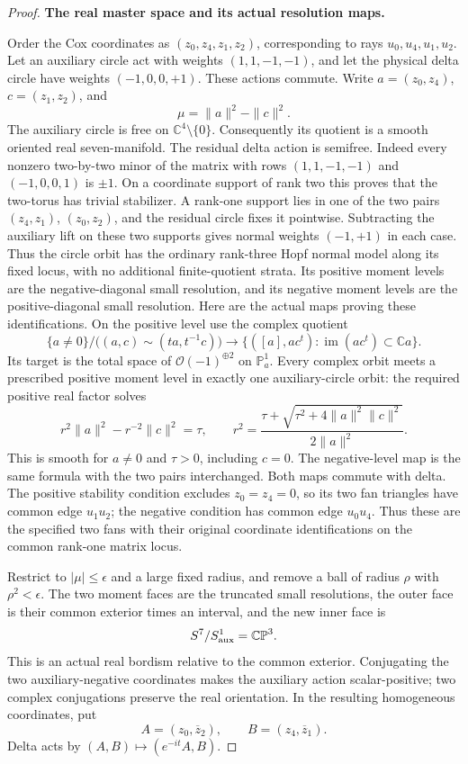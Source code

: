 \begin{proof}
\par\medskip\noindent\textbf{The real master space and its actual resolution maps.}\enspace

Order the Cox coordinates as \((z_0,z_4,z_1,z_2)\), corresponding
to rays \(u_0,u_4,u_1,u_2\).  Let an auxiliary circle act with
weights \((1,1,-1,-1)\), and let the physical delta circle have
weights \((-1,0,0,+1)\).  These actions commute.  Write
\(a=(z_0,z_4)\), \(c=(z_1,z_2)\), and
\[
       \mu=\|a\|^2-\|c\|^2.
\]
The auxiliary circle is free on \(\mathbb C^4\setminus\{0\}\).
Consequently its quotient is a smooth oriented real seven-manifold.
The residual delta action is semifree.  Indeed every nonzero
two-by-two minor of the matrix with rows
\((1,1,-1,-1)\) and \((-1,0,0,1)\) is \(\pm1\).
On a coordinate support of rank two this proves that the
two-torus has trivial stabilizer.  A rank-one support lies in
one of the two pairs \((z_4,z_1)\), \((z_0,z_2)\),
and the residual circle fixes it pointwise.  Subtracting the
auxiliary lift on these two supports gives normal weights
\((-1,+1)\) in each case.  Thus the circle orbit has the
ordinary rank-three Hopf normal model along its fixed locus,
with no additional finite-quotient strata.
Its positive moment levels are the negative-diagonal small resolution,
and its negative moment levels are the positive-diagonal small
resolution.  Here are the actual maps proving these identifications.
On the positive level use the complex quotient
\[
   \{a\ne0\}\big/\bigl((a,c)\sim(ta,t^{-1}c)\bigr)
       \longrightarrow
   \{([a],ac^t):\operatorname{im}(ac^t)\subset\mathbb Ca\}.
\]
Its target is the total space of \(\mathcal O(-1)^{\oplus2}\)
on \(\mathbb P^1_a\).  Every complex orbit meets a prescribed
positive moment level in exactly one auxiliary-circle orbit:
the required positive real factor solves
\[
 r^2\|a\|^2-r^{-2}\|c\|^2=\tau,
 \qquad
 r^2=\frac{\tau+\sqrt{\tau^2+4\|a\|^2\|c\|^2}}
                 {2\|a\|^2}.
\]
This is smooth for \(a\ne0\) and \(\tau>0\), including
\(c=0\).  The negative-level map is the same formula with
the two pairs interchanged.  Both maps commute with delta.
The positive stability condition excludes \(z_0=z_4=0\),
so its two fan triangles have common edge \(u_1u_2\);
the negative condition has common edge \(u_0u_4\).
Thus these are the specified two fans with their original
coordinate identifications on the common rank-one matrix locus.

Restrict to \(|\mu|\le\epsilon\) and a large fixed radius,
and remove a ball of radius \(\rho\) with \(\rho^2<\epsilon\).
The two moment faces are the truncated small resolutions, the
outer face is their common exterior times an interval, and the
new inner face is
\[
             S^7/S^1_{\rm aux}=\mathbb {CP}^3.
\]
This is an actual real bordism relative to the common exterior.
Conjugating the two auxiliary-negative coordinates makes the
auxiliary action scalar-positive; two complex conjugations
preserve the real orientation.  In the resulting homogeneous
coordinates, put
\[
       A=(z_0,\overline z_2),\qquad
       B=(z_4,\overline z_1).
\]
Delta acts by \((A,B)\mapsto(e^{-it}A,B)\).


\end{proof}
